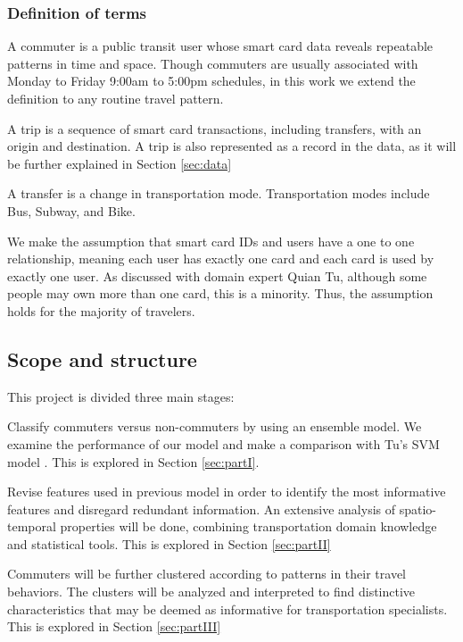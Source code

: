 \documentclass{article}
\begin{document}
\subsubsection{Definition of terms}
A commuter is a public transit user whose smart card data reveals repeatable patterns in time and space. Though commuters are usually associated with Monday to Friday 9:00am to 5:00pm schedules, in this work we extend the definition to any routine travel pattern. 

A trip is a sequence of smart card transactions, including transfers, with an origin and destination. A trip is also represented as a record in the data, as it will be further explained in Section \ref{sec:data}

A transfer is a change in transportation mode. Transportation modes include Bus, Subway, and Bike. 

We make the assumption that smart card IDs and users have a one to one relationship, meaning each user has exactly one card and each card is used by exactly one user. As discussed with domain expert Quian Tu, although some people may own more than one card, this is a minority. Thus, the assumption holds for the majority of travelers. 

\subsection{Scope and structure}
This project is divided three main stages: 

\begin{description}[align=right,labelwidth=2cm]
\item[PART I] Classify commuters versus non-commuters by using an ensemble model. We examine the performance of our model and make a comparison with Tu's SVM model \cite{tu2016impact}. This is explored in Section \ref{sec:partI}.

\item[PART II] Revise features used in previous model in order to identify the most informative features and disregard redundant information. An extensive analysis of spatio-temporal properties will be done, combining transportation domain knowledge and statistical tools. This is explored in Section \ref{sec:partII}

\item[PART III] Commuters will be further clustered according to patterns in their travel behaviors. The clusters will be analyzed and interpreted to find distinctive characteristics that may be deemed as informative for transportation specialists. This is explored in Section \ref{sec:partIII}
\end{description}
\end{document}
